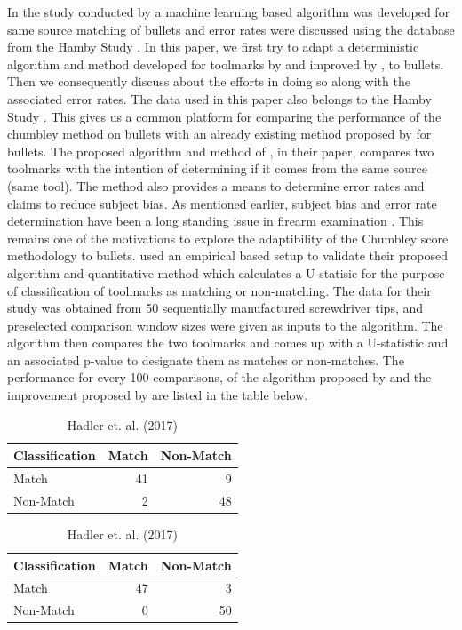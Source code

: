 \documentclass[12pt]{article}
\begin{document}
In the study conducted by \citet{aoas} a machine learning based
algorithm was developed for same source matching of bullets and error
rates were discussed using the database from the Hamby Study
\citep{hamby}. In this paper, we first try to adapt a deterministic
algorithm and method developed for toolmarks by \citet{chumbley} and
improved by \citet{hadler}, to bullets. Then we consequently discuss
about the efforts in doing so along with the associated error rates. The
data used in this paper also belongs to the Hamby Study \citep{hamby}.
This gives us a common platform for comparing the performance of the
chumbley method on bullets with an already existing method proposed by
\citet{aoas} for bullets. The proposed algorithm and method of
\citet{chumbley}, in their paper, compares two toolmarks with the
intention of determining if it comes from the same source (same tool).
The method also provides a means to determine error rates and claims to
reduce subject bias. As mentioned earlier, subject bias and error rate
determination have been a long standing issue in firearm examination
\citep{NAS:2009}. This remains one of the motivations to explore the
adaptibility of the Chumbley score methodology to bullets.
\citet{chumbley} used an empirical based setup to validate their
proposed algorithm and quantitative method which calculates a U-statisic
for the purpose of classification of toolmarks as matching or
non-matching. The data for their study was obtained from 50 sequentially
manufactured screwdriver tips, and preselected comparison window sizes
were given as inputs to the algorithm. The algorithm then compares the
two toolmarks and comes up with a U-statistic and an associated p-value
to designate them as matches or non-matches. The performance for every
100 comparisons, of the algorithm proposed by \citet{chumbley} and the
improvement proposed by \citet{hadler} are listed in the table below.

\begin{table}[!htb]
    \begin{minipage}{.5\linewidth}
      \caption{Chumbley et al. 2010}
      \centering 
\begin{tabular}{lrr}
\toprule
Classification & Match & Non-Match\\
\midrule
Match & 41 & 9\\
Non-Match & 2 & 48\\
\bottomrule
\end{tabular} \end{minipage}%
    \begin{minipage}{.5\linewidth}
      \centering
        \caption{Hadler et. al. (2017)} 
\begin{tabular}{lrr}
\toprule
Classification & Match & Non-Match\\
\midrule
Match & 47 & 3\\
Non-Match & 0 & 50\\
\bottomrule
\end{tabular} \end{minipage} 
\end{table}
\end{document}
